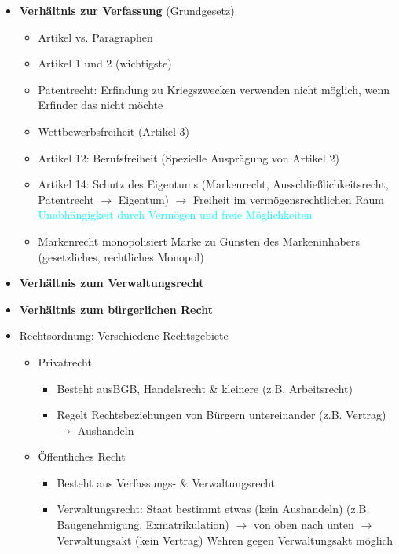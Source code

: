 \documentclass{report}
\begin{document}
\begin{itemize}
	\item \textbf{Verhältnis zur Verfassung} (Grundgesetz)
	\begin{itemize}
		\item Artikel vs. Paragraphen
		\item Artikel 1 und 2 (wichtigste)
		\item Patentrecht:
		\newline Erfindung zu Kriegszwecken verwenden nicht möglich, wenn Erfinder das nicht möchte
		\item Wettbewerbsfreiheit (Artikel 3)
		\item Artikel 12: Berufsfreiheit (Spezielle Ausprägung von Artikel 2)
		\item Artikel 14: Schutz des Eigentums (Markenrecht, Ausschließlichkeitsrecht, Patentrecht $\rightarrow$ Eigentum)
		\newline $\rightarrow$ Freiheit im vermögensrechtlichen Raum
		\newline \textcolor{cyan}{Unabhängigkeit durch Vermögen und freie Möglichkeiten}
		\item Markenrecht monopolisiert Marke zu Gunsten des Markeninhabers (gesetzliches, rechtliches Monopol)
	\end{itemize}
	\item \textbf{Verhältnis zum Verwaltungsrecht}
	\item \textbf{Verhältnis zum bürgerlichen Recht}
	\item Rechtsordnung: Verschiedene Rechtsgebiete
	\begin{itemize}
		\item Privatrecht
		\begin{itemize}
			\item Besteht ausBGB, Handelsrecht \& kleinere (z.B. Arbeitsrecht)
			\item Regelt Rechtsbeziehungen von Bürgern untereinander (z.B. Vertrag) $\rightarrow$ Aushandeln
		\end{itemize}
		\item Öffentliches Recht
		\begin{itemize}
			\item Besteht aus Verfassungs- \& Verwaltungsrecht
			\item Verwaltungsrecht: Staat bestimmt etwas (kein Aushandeln) (z.B. Baugenehmigung, Exmatrikulation)
			\newline $\rightarrow$ von oben nach unten $\rightarrow$ Verwaltungsakt (kein Vertrag)
			\newline Wehren gegen Verwaltungsakt möglich

\end{itemize}
\end{itemize}
\end{itemize}
\end{document}
